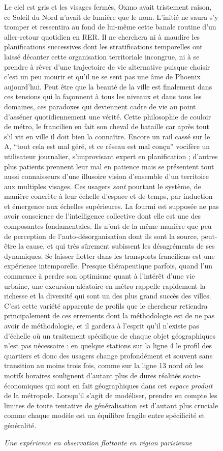 \begin{figure}[h!]
\begin{mdframed}
Le ciel est gris et les visages fermés, Oxmo avait tristement raison, ce Soleil du Nord n'avait de lumière que le nom. L'initié ne saura s'y tromper et ressentira au fond de lui-même cette banale routine d'un aller-retour quotidien en RER. Il ne cherchera ni à maudire les planifications successives dont les stratifications temporelles ont laissé décanter cette organisation territoriale incongrue, ni à se prendre à rêver d'une trajectoire de vie alternative puisque choisir c'est un peu mourir et qu'il ne se sent pas une âme de Phoenix aujourd'hui. Peut être que la beauté de la ville est finalement dans ces tensions qui la façonnent à tous les niveaux et dans tous les domaines, ces paradoxes qui deviennent cadre de vie au point d'asséner quotidiennement une vérité. Cette philosophie de couloir de métro, le francilien en fait son cheval de bataille car après tout s'il vit en ville il doit bien la connaître. Encore un rail cassé sur le A, ``tout cela est mal géré, et ce réseau est mal conçu'' vocifère un utilisateur journalier, s'improvisant expert en planification ; d'autres plus patients prennent leur mal en patience mais se présentent tout aussi connaisseurs d'une illusoire vision d'ensemble d'un territoire aux multiples visages. Ces usagers \emph{sont} pourtant le système, de manière concrète à leur échelle d'espace et de temps, par induction et émergence aux échelles supérieures. La fourmi est supposée ne pas avoir conscience de l'intelligence collective dont elle est une des composantes fondamentales. Ils n'ont de la même manière que peu de perception de l'auto-désorganisation dont ils sont la source, peut-être la cause, et qui très sûrement subissent les désagréments de ses dynamiques. Se laisser flotter dans les transports franciliens est une expérience intemporelle. Presque thérapeutique parfois, quand l'un commence à perdre son optimisme quant à l'intérêt d'une vie urbaine, une excursion aléatoire en métro rappelle rapidement la richesse et la diversité qui sont un des plus grand succès des villes. C'est cette variété apparente de profils que le chercheur retiendra principalement de ces errements dont la méthodologie est de ne pas avoir de méthodologie, et il gardera à l'esprit qu'il n'existe pas d'échelle où un traitement spécifique de chaque objet géographiques n'est pas nécessaire : en quelque stations sur la ligne 4 le profil des quartiers et donc des usagers change profondément et souvent sans transition au moins trois fois, comme sur la ligne 13 nord où les motifs horaires soulignent d'autant plus de dures réalités socio-économiques qui sont en fait géographiques dans cet \emph{espace produit} de la métropole. Lorsqu'il s'agit de modéliser, prendre en compte les limites de toute tentative de généralisation est d'autant plus cruciale comme chaque modèle est un équilibre fragile entre spécificité et généralité.

\medskip

 \textit{Une expérience en observation flottante en région parisienne}
\end{mdframed}
\end{figure}


